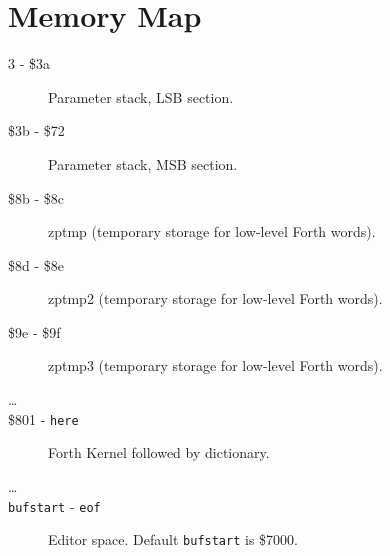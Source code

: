 \chapter{Memory Map}

\begin{description}
\item[3 - \$3a] Parameter stack, LSB section.
\item[\$3b - \$72] Parameter stack, MSB section.
\item[\$8b - \$8c] zptmp (temporary storage for low-level Forth words).
\item[\$8d - \$8e] zptmp2 (temporary storage for low-level Forth words).
\item[\$9e - \$9f] zptmp3 (temporary storage for low-level Forth words).
\item[\ldots]
\item[\$801 - \texttt{here}] Forth Kernel followed by dictionary.
\item[\ldots]
\item[\texttt{bufstart} - \texttt{eof}] Editor space. Default \texttt{bufstart} is \$7000.
\end{description}

